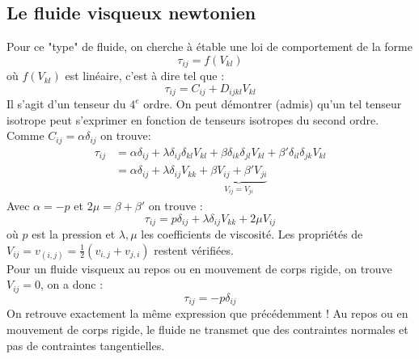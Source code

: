     
    \subsection{Le fluide visqueux newtonien}
    Pour ce "type" de fluide, on cherche à étable une loi de comportement de la forme 
    \begin{equation}
    \tau_{ij} = f(V_{kl})
    \end{equation}
    où $f(V_{kl})$ est linéaire, c'est à dire tel que :
    \begin{equation}
    \tau_{ij} = C_{ij} + D_{ijkl}V_{kl}
    \end{equation}
    Il s'agit d'un tenseur du $4^e$ ordre. On peut démontrer (admis) qu'un tel tenseur isotrope
    peut s'exprimer en fonction de tenseurs isotropes du second ordre. Comme $C_{ij} = \alpha
    \delta_{ij}$ on trouve:
    \begin{equation}
    \begin{array}{ll}
    \tau_{ij} &= \alpha\delta_{ij} + \lambda \delta_{ij}\delta_{kl}V_{kl} + \beta
    \delta_{ik}\delta_{jl}V_{kl} + \beta' \delta_{il}\delta_{jk}V_{kl}  \\
     &= \alpha\delta_{ij} + \lambda\delta_{ij}V_{kk} + \underbrace{\beta V_{ij} + \beta' 
     V_{ji}}_{V_{ij} = V_{ji}}
    \end{array}
    \end{equation}
    Avec $\alpha = -p$ et $2\mu = \beta + \beta'$ on trouve :
    \begin{equation}
    \tau_{ij} = p\delta_{ij} + \lambda\delta_{ij}V_{kk} + 2\mu V_{ij}
    \label{eq:ComportementVisqNew}
    \end{equation}
    où $p$ est la pression et $\lambda,\mu$ les coefficients de viscosité. Les propriétés
    de $V_{ij} = v_{(i,j)} = \frac{1}{2}(v_{i,j}+v_{j,i})$ restent vérifiées.\\
    Pour un fluide visqueux au repos ou en mouvement de corps rigide, on trouve $V_{ij}=0$, 
    on a donc :
    \begin{equation}
    \tau_{ij} = -p\delta_{ij}
    \end{equation}
    On retrouve exactement la même expression que précédemment ! Au repos ou en mouvement 
    de corps rigide, le fluide ne transmet que des contraintes normales et pas de contraintes
    tangentielles.
    
